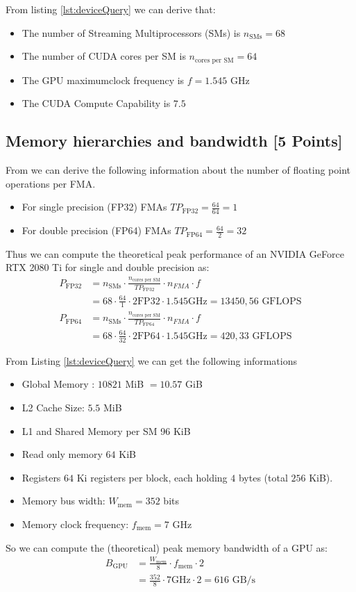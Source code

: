 \documentclass[unicode,10pt,a4paper,oneside,numbers=endperiod,openany]{scrartcl}
\begin{document}
From listing \ref{lst:deviceQuery} we can derive that:
\begin{itemize}
  \item The number of Streaming Multiprocessors (SMs) is $n_{\text{SMs}} = 68$
  \item The number of CUDA cores per SM is $n_{\text{cores per SM}} = 64$ 
  \item The GPU maximumclock frequency is $f = 1.545$ GHz
  \item  The CUDA Compute Capability is $7.5$
\end{itemize}

\subsection{Memory hierarchies and bandwidth [5 Points]}
From \cite{hpc_cuda_best_practices_guide} we can derive the following information about the number of floating point operations per FMA.
\begin{itemize}
  \item For single precision (FP32) FMAs $TP_{\text{FP32}}=\frac{64}{64}=1$
  \item For double precision (FP64) FMAs $TP_{\text{FP64}}=\frac{64}{2}=32$
\end{itemize}
Thus we can compute the theoretical peak performance of an NVIDIA GeForce RTX 2080 Ti for single and double precision as:
\begin{align*}
  P_{\text{FP32}} &= n_{\text{SMs}} \cdot \frac{n_{\text{cores per SM}}}{TP_{\text{FP32}}} \cdot n_{FMA} \cdot f\\ &= 68 \cdot \frac{64}{1} \cdot 2 \text{FP32} \cdot 1.545 \text{GHz} = 13450,56 \text{ GFLOPS} \\
  P_{\text{FP64}} &= n_{\text{SMs}} \cdot \frac{n_{\text{cores per SM}}}{TP_{\text{FP64}}} \cdot n_{FMA} \cdot f \\ &= 68 \cdot \frac{64}{32} \cdot 2 \text{FP64} \cdot 1.545 \text{GHz} = 420,33  \text{ GFLOPS}
\end{align*}

From Listing \ref{lst:deviceQuery} we can get the following informations
\begin{itemize}
  \item Global Memory : $10821$ MiB $ =10.57 $ GiB
  \item L2 Cache Size: $5.5$ MiB
  \item L1 and Shared Memory per SM 96 KiB 
  \item Read only memory $64$ KiB
  \item Registers $64$ Ki registers per block, each holding $4$ bytes (total $256$ KiB).
  \item Memory bus width: $W_{\text{mem}} = 352$ bits
  \item Memory clock frequency: $f_{\text{mem}} = 7$ GHz
\end{itemize}
So we can compute the (theoretical) peak memory bandwidth of a GPU as:
\begin{align*}
  B_{\text{GPU}} &= \frac{W_{\text{mem}}}{8} \cdot f_{\text{mem}} \cdot 2\\
  &= \frac{352}{8} \cdot 7 \text{GHz} \cdot 2 = 616 \text{ GB/s}
\end{align*}
\end{document}
